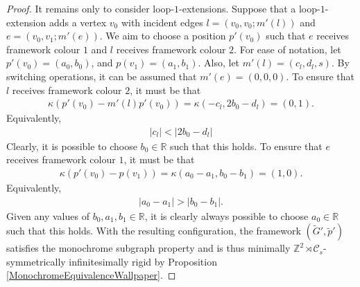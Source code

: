 \documentclass[reqno,a4paper,10pt]{article}
\theoremstyle{definition}
\theoremstyle{remark}
\numberwithin{equation}{section}
\numberwithin{figure}{section}
\numberwithin{table}{section}
\newcommand{\R}{\mathbb{R}}
\newcommand{\Z}{\mathbb{Z}}
\newcommand{\G}{\tilde{G}}
\newcommand{\p}{\tilde{p}}
\begin{document}
\begin{proof}
        It remains only to consider loop-$1$-extensions. Suppose that a loop-$1$-extension adds a vertex $v_0$ with incident edges $l=(v_0,v_0;m'(l))$ and $e=(v_0,v_1;m'(e))$. We aim to choose a position $p'(v_0)$ such that $e$ receives framework colour $1$ and $l$ receives framework colour $2$. For ease of notation, let $p'(v_0)=(a_0,b_0)$, and $p(v_1)=(a_1,b_1)$. Also, let $m'(l)=(c_l,d_l,s)$. By switching operations, it can be assumed that $m'(e)=(0,0,0)$. To ensure that $l$ receives framework colour $2$, it must be that
        \begin{align*}
            \kappa(p'(v_0)-m'(l)p'(v_0))=\kappa(-c_l,2b_0-d_l)=(0,1).
        \end{align*}
        Equivalently,
        \begin{align*}
            |c_l|<|2b_0-d_l|
        \end{align*}
               Clearly, it is possible to choose $b_0\in\R$ such that this holds. To ensure that $e$ receives framework colour $1$, it must be that
        \begin{align*}
            \kappa(p'(v_0)-p(v_1))=\kappa(a_0-a_1,b_0-b_1)=(1,0).
        \end{align*}
        Equivalently,
        \begin{align*}
            |a_0-a_1|>|b_0-b_1|.
        \end{align*}
        Given any values of $b_0,a_1,b_1\in\R$, it is clearly always possible to choose $a_0\in\R$ such that this holds. With the resulting configuration, the framework $(\G',\p')$ satisfies the monochrome subgraph property and is thus minimally $\Z^2\rtimes\mathcal{C}_s$-symmetrically infinitesimally rigid by Proposition \ref{MonochromeEquivalenceWallpaper}.
    \end{proof}
\end{document}
